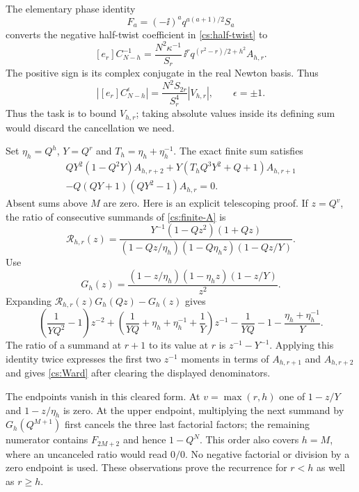 The elementary phase identity
\[
 F_a=(-\ii)^a q^{a(a+1)/2}S_a
\]
converts the negative half-twist coefficient in \eqref{cs:half-twist} to
\[
 [e_r]C_{N-h}^{-1}
 =\frac{N^2\kappa^{-1}}{S_r}\,
 \ii^r q^{(r^2-r)/2+h^2}A_{h,r}.
\]
The positive sign is its complex conjugate in the real Newton basis. Thus
\begin{equation}\label{cs:exact-modulus}
 |[e_r]C_{N-h}^{\epsilon}|=
 \frac{N^2S_{2r}}{S_r^4}|V_{h,r}|,
 \qquad \epsilon=\pm1.
\end{equation}
Thus the task is to bound $V_{h,r}$; taking absolute values inside its defining sum would discard the cancellation we need.

Set $\eta_h=Q^h$, $Y=Q^r$ and $T_h=\eta_h+\eta_h^{-1}$. The exact finite sum satisfies
\begin{multline}\label{cs:Ward}
 QY^2(1-Q^2Y)A_{h,r+2}
 +Y(T_hQ^3Y^2+Q+1)A_{h,r+1}\\
 -Q(QY+1)(QY^2-1)A_{h,r}=0.
\end{multline}
Absent sums above $M$ are zero. Here is an explicit telescoping proof. If $z=Q^v$, the ratio of consecutive summands of \eqref{cs:finite-A} is
\[
 \mathcal R_{h,r}(z)=\frac{Y^{-1}(1-Qz^2)(1+Qz)}
 {(1-Qz/\eta_h)(1-Q\eta_h z)(1-Qz/Y)}.
\]
Use
\[
 G_h(z)=\frac{(1-z/\eta_h)(1-\eta_h z)(1-z/Y)}{z^2}.
\]
Expanding $\mathcal R_{h,r}(z)G_h(Qz)-G_h(z)$ gives
\begin{equation}\label{cs:telescoper}
 \left(\frac1{YQ^2}-1\right)z^{-2}
 +\left(\frac1{YQ}+\eta_h+\eta_h^{-1}+\frac1Y\right)z^{-1}
 -\frac1{YQ}-1-\frac{\eta_h+\eta_h^{-1}}Y.
\end{equation}
The ratio of a summand at $r+1$ to its value at $r$ is $z^{-1}-Y^{-1}$. Applying this identity twice expresses the first two $z^{-1}$ moments in terms of $A_{h,r+1}$ and $A_{h,r+2}$ and gives \eqref{cs:Ward} after clearing the displayed denominators.

The endpoints vanish in this cleared form. At $v=\max(r,h)$ one of $1-z/Y$ and $1-z/\eta_h$ is zero. At the upper endpoint, multiplying the next summand by $G_h(Q^{M+1})$ first cancels the three last factorial factors; the remaining numerator contains $F_{2M+2}$ and hence $1-Q^N$. This order also covers $h=M$, where an uncanceled ratio would read $0/0$. No negative factorial or division by a zero endpoint is used. These observations prove the recurrence for $r<h$ as well as $r\ge h$.

